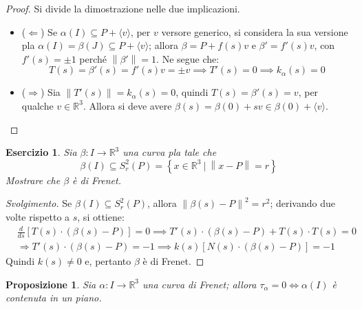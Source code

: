 \documentclass[12pt]{article}
\theoremstyle{style}
\newtheorem{prop}{Proposizione}[section]
\newtheorem{esercizio}{Esercizio}[section]
\newenvironment{svolgimento}{\renewcommand\qedsymbol{$\blacksquare$}\begin{proof}[Svolgimento]}{\end{proof}}
\numberwithin{equation}{subsection}
\begin{document}
	\begin{proof}
		Si divide la dimostrazione nelle due implicazioni.
		\begin{itemize}
			\item ($\Leftarrow$) Se $\alpha (I) \subseteq P+ \langle v \rangle$, per $v$ versore generico, si considera la sua versione pla $\alpha (I) = \beta (J) \subseteq P+\langle v \rangle$; allora $\beta = P + f(s) v$ e $\beta '=f'(s) v$, con $f'(s)=\pm 1$ perch\'e $\left\lVert \beta ' \right\rVert = 1$. 
				Ne segue che:
				\[
				T(s) = \beta '(s) = f'(s) v = \pm v \implies T'(s) = 0 \implies k_\alpha(s) = 0 
				\] 
			\item ($\Rightarrow $) Sia $\left\lVert T'(s) \right\rVert = k_\alpha (s) = 0 $, quindi $T(s) = \beta '(s) = v $, per qualche $v \in \mathbb{R}^3$.
				Allora si deve avere $\beta (s) =  \beta (0)+ s v \in \beta (0) +\langle v \rangle$.
		\end{itemize}
	\end{proof}
\begin{esercizio}
Sia $\beta :I \to \mathbb{R}^3$ una curva pla tale che
\[
\beta (I) \subseteq S_r^2(P) = \left\{ x \in \mathbb{R}^3 \ \big\lvert\ \left\lVert x- P \right\rVert = r\right\} 
\] 
Mostrare che $\beta  $ \`e di Frenet.
\end{esercizio}
\begin{svolgimento}
	Se $\beta (I) \subseteq S_r^2(P)$, allora $\left\lVert \beta (s) - P \right\rVert ^2 = r^2$; derivando due volte rispetto a $s$, si ottiene:
	\[
		\begin{split}
			&\frac{d }{d s}\left[  T(s) \cdot (\beta (s) - P )  \right] = 0 \implies T'(s) \cdot (\beta (s) - P) + T(s) \cdot T(s) = 0 \\
			&\Rightarrow T'(s) \cdot (\beta (s) - P) = -1 \implies k(s) \left[ N(s) \cdot (\beta (s) - P) \right] = - 1
		\end{split}
	\] 
	Quindi $k(s) \neq 0$ e, pertanto $\beta $ \`e di Frenet.
\end{svolgimento}
\begin{prop}
	Sia $\alpha  : I \to \mathbb{R}^3$ una curva di Frenet; allora $\tau _\alpha = 0 \iff \alpha (I)$ \`e contenuta in un piano.
\end{prop}
\end{document}

